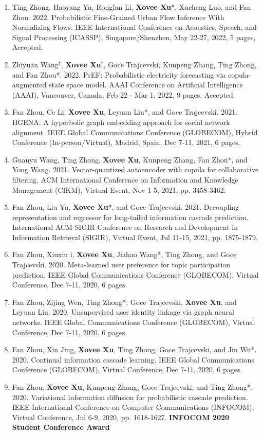 \begin{enumerate}[resume]
    \item Ting Zhong, Haoyang Yu, Rongfan Li, \textbf{Xovee Xu}*, Xucheng Luo, and Fan Zhou. 2022. Probabilistic Fine-Grained Urban Flow Inference With Normalizing Flows. IEEE International Conference on Acoustics, Speech, and Signal Processing (ICASSP), Singapore/Shenzhen, May 22-27, 2022, 5 pages, Accepted.
    \item Zhiyuan Wang$^\dagger$, \textbf{Xovee Xu}$^\dagger$, Goce Trajcevski, Kunpeng Zhang, Ting Zhong, and Fan Zhou*. 2022. PrEF: Probabilistic electricity forecasting via copula-augmented state space model. AAAI Conference on Artificial Intelligence (AAAI), Vancouver, Canada, Feb 22 - Mar 1, 2022, 9 pages, Accepted.
    \item Fan Zhou, Ce Li, \textbf{Xovee Xu}, Leyuan Liu*, and Goce Trajcevski. 2021. HGENA: A hyperbolic graph embedding approach for social network alignment. IEEE Global Communications Conference (GLOBECOM), Hybrid Conference (In-person/Virtual), Madrid, Spain, Dec 7-11, 2021, 6 pages.
    \item Guanyu Wang, Ting Zhong, \textbf{Xovee Xu}, Kunpeng Zhang, Fan Zhou*, and Yong Wang. 2021. Vector-quantized autoencoder with copula for collaborative filtering. ACM International Conference on Information and Knowledge Management (CIKM), Virtual Event, Nov 1-5, 2021, pp. 3458-3462.
    \item Fan Zhou, Liu Yu, \textbf{Xovee Xu}*, and Goce Trajcevski. 2021. Decoupling representation and regressor for long-tailed information cascade prediction. International ACM SIGIR Conference on Research and Development in Information Retrieval (SIGIR), Virtual Event, Jul 11-15, 2021, pp. 1875-1879.
    \item Fan Zhou, Xiuxiu \swashQ i, \textbf{Xovee Xu}, Jiahao Wang*, Ting Zhong, and Goce Trajcevski. 2020. Meta-learned user preference for topic participation prediction. IEEE Global Communications Conference (GLOBECOM), Virtual Conference, Dec 7-11, 2020, 6 pages.
    \item Fan Zhou, Zijing Wen, Ting Zhong*, Goce Trajcevski, \textbf{Xovee Xu}, and Leyuan Liu. 2020. Unsupervised user identity linkage via graph neural networks. IEEE Global Communications Conference (GLOBECOM), Virtual Conference, Dec 7-11, 2020, 6 pages.
    \item Fan Zhou, Xin Jing, \textbf{Xovee Xu}, Ting Zhong, Goce Trajcevski, and Jin Wu*. 2020. Continual information cascade learning. IEEE Global Communications Conference (GLOBECOM), Virtual Conference, Dec 7-11, 2020, 6 pages.
    \item Fan Zhou, \textbf{Xovee Xu}, Kunpeng Zhang, Goce Trajcevski, and Ting Zhong*. 2020. Variational information diffusion for probabilistic cascade prediction. IEEE International Conference on Computer Communications (INFOCOM), Virtual Conference, Jul 6-9, 2020, pp. 1618-1627.
    \newline \textbf{\color{red}INFOCOM 2020 Student Conference Award}
\end{enumerate}

